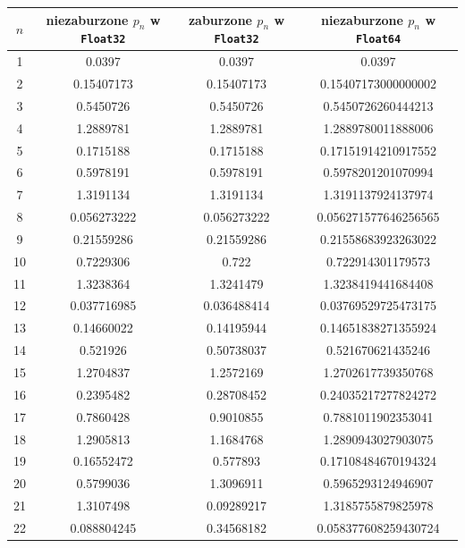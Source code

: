\documentclass{article}
\begin{document}
\begin{table}[h!]
    \centering
    \begin{tabular}{ |c|c|c|c| }
    \hline
    $n$ & niezaburzone $p_n$ w \texttt{Float32} & zaburzone $p_n$ w \texttt{Float32} & niezaburzone $p_n$ w \texttt{Float64} \\
    \hline
    1 & 0.0397 & 0.0397 & 0.0397 \\
    \hline
    2 & 0.15407173 & 0.15407173 & 0.15407173000000002 \\
    \hline
    3 & 0.5450726 & 0.5450726 & 0.5450726260444213 \\
    \hline
    4 & 1.2889781 & 1.2889781 & 1.2889780011888006 \\
    \hline
    5 & 0.1715188 & 0.1715188 & 0.17151914210917552 \\
    \hline
    6 & 0.5978191 & 0.5978191 & 0.5978201201070994 \\
    \hline
    7 & 1.3191134 & 1.3191134 & 1.3191137924137974 \\
    \hline
    8 & 0.056273222 & 0.056273222 & 0.056271577646256565 \\
    \hline
    9 & 0.21559286 & 0.21559286 & 0.21558683923263022 \\
    \hline
    10 & 0.7229306 & 0.722 & 0.722914301179573 \\
    \hline
    11 & 1.3238364 & 1.3241479 & 1.3238419441684408 \\
    \hline
    12 & 0.037716985 & 0.036488414 & 0.03769529725473175 \\
    \hline
    13 & 0.14660022 & 0.14195944 & 0.14651838271355924 \\
    \hline
    14 & 0.521926 & 0.50738037 & 0.521670621435246 \\
    \hline
    15 & 1.2704837 & 1.2572169 & 1.2702617739350768 \\
    \hline
    16 & 0.2395482 & 0.28708452 & 0.24035217277824272 \\
    \hline
    17 & 0.7860428 & 0.9010855 & 0.7881011902353041 \\
    \hline
    18 & 1.2905813 & 1.1684768 & 1.2890943027903075 \\
    \hline
    19 & 0.16552472 & 0.577893 & 0.17108484670194324 \\
    \hline
    20 & 0.5799036 & 1.3096911 & 0.5965293124946907 \\
    \hline
    21 & 1.3107498 & 0.09289217 & 1.3185755879825978 \\
    \hline
    22 & 0.088804245 & 0.34568182 & 0.058377608259430724 \\

\end{tabular}
\end{table}
\end{document}
